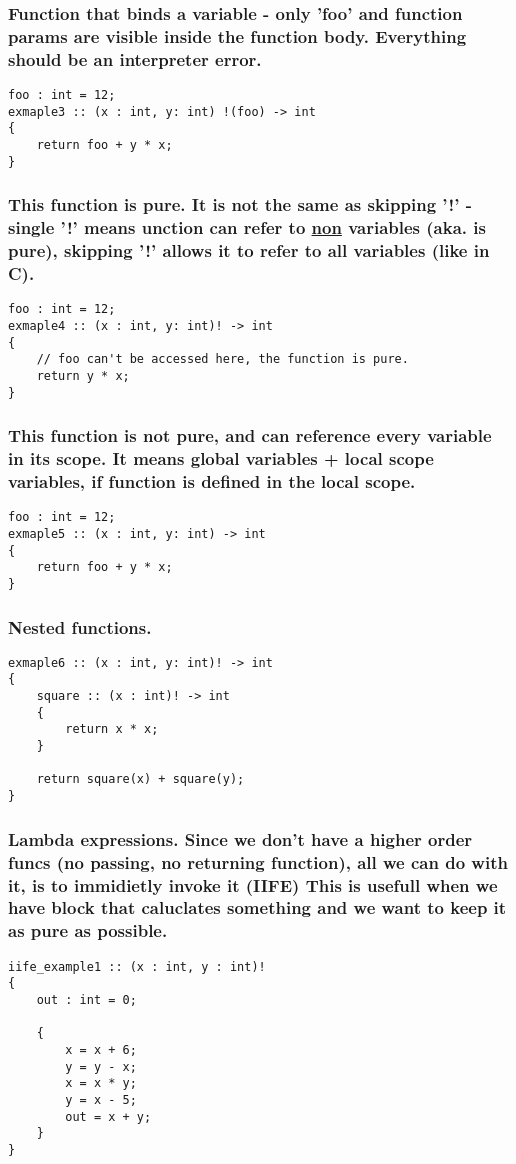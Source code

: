 \documentclass[11pt]{article}
\begin{document}
\subsubsection*{Function that binds a variable - only 'foo' and function params are visible inside the function body. Everything should be an interpreter error.}
\label{sec:org1920550}
\begin{verbatim}
foo : int = 12;
exmaple3 :: (x : int, y: int) !(foo) -> int
{
    return foo + y * x;
}
\end{verbatim}

\subsubsection*{This function is pure. It is not the same as skipping '!' - single '!' means unction can refer to \underline{non} variables (aka. is pure), skipping '!' allows it to refer to all variables (like in C).}
\label{sec:org874f13d}
\begin{verbatim}
foo : int = 12;
exmaple4 :: (x : int, y: int)! -> int
{
    // foo can't be accessed here, the function is pure.
    return y * x;
}
\end{verbatim}

\subsubsection*{This function is not pure, and can reference every variable in its scope. It means global variables + local scope variables, if function is defined in the local scope.}
\label{sec:orgcb3131b}
\begin{verbatim}
foo : int = 12;
exmaple5 :: (x : int, y: int) -> int
{
    return foo + y * x;
}
\end{verbatim}

\subsubsection*{Nested functions.}
\label{sec:org7261d35}
\begin{verbatim}
exmaple6 :: (x : int, y: int)! -> int
{
    square :: (x : int)! -> int
    {
        return x * x;
    }

    return square(x) + square(y);
}
\end{verbatim}

\subsubsection*{Lambda expressions. Since we don't have a higher order funcs (no passing, no returning function), all we can do with it, is to immidietly invoke it (IIFE) This is usefull when we have block that caluclates something and we want to keep it as pure as possible.}
\label{sec:org4808bb9}
\begin{verbatim}
iife_example1 :: (x : int, y : int)!
{
    out : int = 0;

    {
        x = x + 6;
        y = y - x;
        x = x * y;
        y = x - 5;
        out = x + y;
    }
}
\end{verbatim}
\end{document}
